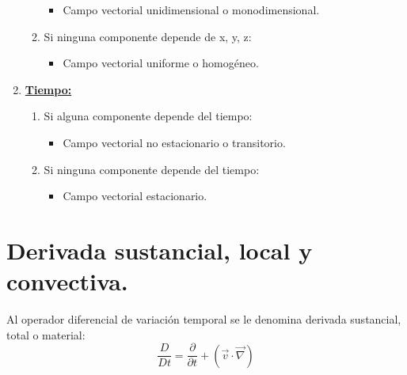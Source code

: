\begin{enumerate}
\begin{enumerate}
		\begin{itemize}
			\item Campo vectorial unidimensional o monodimensional.
		\end{itemize}
		\item Si ninguna componente depende de x, y, z: 
		\begin{itemize}
			\item Campo vectorial uniforme o homogéneo.
		\end{itemize}
	\end{enumerate}
	\item \underline{\textbf{Tiempo:}}
	\begin{enumerate}
		\item Si alguna componente depende del tiempo:
		\begin{itemize}
			\item Campo vectorial no estacionario o transitorio.
		\end{itemize}
		\item Si ninguna componente depende del tiempo:
		\begin{itemize}
			\item Campo vectorial estacionario.
		\end{itemize}
	\end{enumerate}
\end{enumerate}

\section{Derivada sustancial, local y convectiva.}
Al operador diferencial de variación temporal se le denomina derivada sustancial, total o material:
\[\dfrac{D}{Dt}=\dfrac{\partial}{\partial t}+\left(\vec{v} \cdot \vec{\nabla}\right)\]



